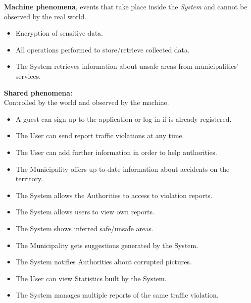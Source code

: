     \noindent\textbf{Machine phenomena}, events that take place inside the \textit{System} and cannot be observed by the real world.
    \begin{itemize}
      \item Encryption of sensitive data.
      \item All operations performed to store/retrieve collected data.
      \item The System retrieves information about unsafe areas from municipalities' services.
    \end{itemize}
    \vspace{0.5cm}
    
    \noindent\textbf{Shared phenomena:}\\\newline
    Controlled by the world and observed by the machine.
    \begin{itemize}
      \item A guest can sign up to the application or log in if is already registered.
      \item The User can send report traffic violations at any time.
     \item The User can add further information in order to help authorities.
      \item The Municipality offers up-to-date information about accidents on the territory.
    \end{itemize}
    
    \vspace{10px}
    
    \begin{itemize}
      \item The System allows the Authorities to access to violation reports.
      \item The System allows users to view own reports.
      \item The System shows inferred safe/unsafe areas.
      \item The Municipality gets suggestions generated by the System.
      \item The System notifies Authorities about corrupted pictures.
      \item The User can view Statistics built by the System.
      \item The System manages multiple reports of the same traffic violation.
    \end{itemize}

